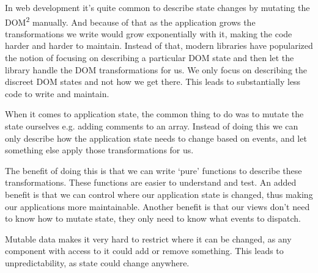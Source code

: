 \documentclass[12pt,twoside]{article}
\begin{document}
In web development it's quite common to describe state changes by mutating the DOM\textsuperscript{2} manually. And because of that as the application  grows the transformations we write would grow exponentially with it, making the code harder and harder to maintain. Instead of that, modern libraries have popularized the notion of focusing on describing a particular DOM state and then let the library handle the DOM transformations for us. We only focus on describing the discreet DOM states and not how we get there. This leads to substantially less code to write and maintain.

When it comes to application state, the common thing to do was to mutate the state ourselves e.g. adding comments to an array.
Instead of doing this we can only describe how the application state needs to change based on events, and let something else apply those transformations for us.

The benefit of doing this is that we can write ‘pure’ functions to describe these transformations. These functions are easier to understand and test. An added benefit is that we can control where our application state is changed, thus making our applications more maintainable. Another benefit is that our views don’t need to know how to mutate state, they only need to know what events to dispatch.



Mutable data makes it very hard to restrict where it can be changed, as any component with access to it could add or remove something. This leads to unpredictability, as state could change anywhere.
\end{document}
